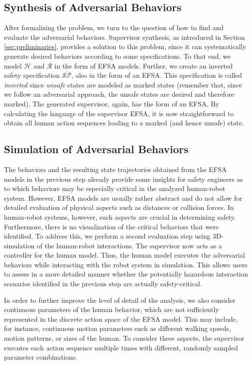 \documentclass[letterpaper, 10 pt, conference]{ieeeconf}  %
\begin{document}
\subsection{Synthesis of Adversarial Behaviors}
After formalizing the problem, we turn to the question of how to find and evaluate the adversarial behaviors. Supervisor synthesis, as introduced in Section \ref{sec:preliminaries}, provides a solution to this problem, since it can systematically generate desired behaviors according to some specifications. To that end, we model $\mathcal{H}$ and $\mathcal{R}$ in the form of EFSA models. Further, we create an inverted safety specification $\overline{\mathcal{SP}}$, also in the form of an EFSA. This specification is called \textit{inverted} since \textit{unsafe} states are modeled as marked states (remember that, since we follow an adversarial approach, the unsafe states are desired and therefore marked). The generated supervisor, again, has the form of an EFSA. By calculating the language of the supervisor EFSA, it is now straightforward to obtain all human action sequences leading to a marked (and hence unsafe) state.

\subsection{Simulation of Adversarial Behaviors}
The behaviors and the resulting state trajectories obtained from the EFSA models in the previous step already provide some insights for safety engineers as to which behaviors may be especially critical in the analyzed human-robot system. However, EFSA models are usually rather abstract and do not allow for detailed evaluation of physical aspects such as distances or collision forces. In human-robot systems, however, such aspects are crucial in determining safety. Furthermore, there is no visualization of the critical behaviors that were identified. To address this, we perform a second evaluation step using 3D-simulation of the human-robot interactions. The supervisor now acts as a controller for the human model. Thus, the human model executes the adversarial behaviors while interacting with the robot system in simulation. This allows users to assess in a more detailed manner whether the potentially hazardous interaction scenarios identified in the previous step are actually safety-critical. 

In order to further improve the level of detail of the analysis, we also consider continuous parameters of the human behavior, which are not sufficiently represented in the discrete action space of the EFSA model. This may include, for instance, continuous motion parameters such as different walking speeds, motion patterns, or sizes of the human. To consider these aspects, the supervisor executes each action sequence multiple times with different, randomly sampled parameter combinations.
\end{document}
